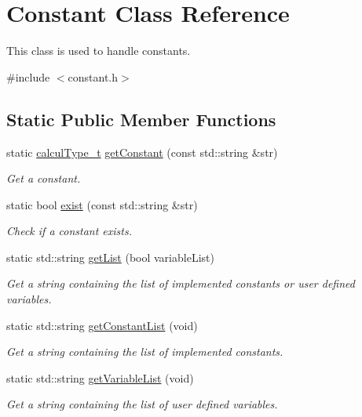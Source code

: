 \hypertarget{class_constant}{}\section{Constant Class Reference}
\label{class_constant}


This class is used to handle constants.  




{\ttfamily \#include $<$constant.\+h$>$}

\subsection*{Static Public Member Functions}
\begin{DoxyCompactItemize}
\item 
static \hyperlink{mpfr_interface_8h_a993860352aef57b15399903c4475a608}{calcul\+Type\+\_\+t} \hyperlink{class_constant_a71937e033e6b5aca6f34afd0d18c80b7}{get\+Constant} (const std\+::string \&str)
\begin{DoxyCompactList}\small\item\em Get a constant. \end{DoxyCompactList}\item 
static bool \hyperlink{class_constant_a2123372df263446010225865fb0a6928}{exist} (const std\+::string \&str)
\begin{DoxyCompactList}\small\item\em Check if a constant exists. \end{DoxyCompactList}\item 
static std\+::string \hyperlink{class_constant_ad8e0484b85273bae2c95113afe80e4d6}{get\+List} (bool variable\+List)
\begin{DoxyCompactList}\small\item\em Get a string containing the list of implemented constants or user defined variables. \end{DoxyCompactList}\item 
static std\+::string \hyperlink{class_constant_a55802cdca68fe477a661fa8d426d5ae7}{get\+Constant\+List} (void)
\begin{DoxyCompactList}\small\item\em Get a string containing the list of implemented constants. \end{DoxyCompactList}\item 
static std\+::string \hyperlink{class_constant_af25afa9fd97935831fb5edddffadb00e}{get\+Variable\+List} (void)
\begin{DoxyCompactList}\small\item\em Get a string containing the list of user defined variables. \end{DoxyCompactList}\item 

\end{DoxyCompactItemize}
